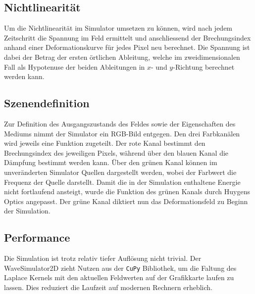 \subsection{Nichtlinearität}
Um die Nichtlinearität im Simulator umsetzen zu können, wird nach jedem Zeitschritt die Spannung im Feld ermittelt und anschliessend der Brechungsindex anhand einer Deformationskurve für jedes Pixel neu berechnet.
Die Spannung ist dabei der Betrag der ersten örtlichen Ableitung, welche im zweidimensionalen Fall als Hypotenuse der beiden Ableitungen in $x$- und $y$-Richtung berechnet werden kann.

\subsection{Szenendefinition}
Zur Definition des Ausgangszustands des Feldes sowie der Eigenschaften des Mediums nimmt der Simulator ein RGB-Bild entgegen.
Den drei Farbkanälen wird jeweils eine Funktion zugeteilt.
Der rote Kanal bestimmt den Brechungsindex des jeweiligen Pixels, während über den blauen Kanal die Dämpfung bestimmt werden kann.
Über den grünen Kanal können im unveränderten Simulator Quellen dargestellt werden, wobei der Farbwert die Frequenz der Quelle darstellt.
Damit die in der Simulation enthaltene Energie nicht fortlaufend ansteigt, wurde die Funktion des grünen Kanals durch Huygens Optics angepasst.
Der grüne Kanal diktiert nun das Deformationsfeld zu Beginn der Simulation.

\subsection{Performance}
Die Simulation ist trotz relativ tiefer Auflösung nicht trivial. 
Der WaveSimulator2D zieht Nutzen aus der \texttt{CuPy} Bibliothek, um die Faltung des Laplace Kernels mit den aktuellen Feldwerten auf der Grafikkarte laufen zu lassen.
Dies reduziert die Laufzeit auf modernen Rechnern erheblich.
